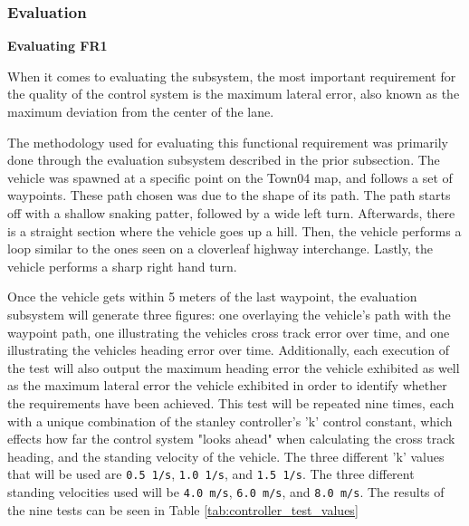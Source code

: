 \documentclass[titlepage,draft]{article}
\begin{document}
{\subsubsection{Evaluation}
\textbf{Evaluating FR1}

When it comes to evaluating the subsystem, the most important requirement for the quality of the control system is the maximum lateral error, also known as the maximum deviation from the center of the lane.

The methodology used for evaluating this functional requirement was primarily done through the evaluation subsystem described in the prior subsection. The vehicle was spawned at a specific point on the Town04 map, and follows a set of waypoints. These path chosen was due to the shape of its path. The path starts off with a shallow snaking patter, followed by a wide left turn. Afterwards, there is a straight section where the vehicle goes up a hill. Then, the vehicle performs a loop similar to the ones seen on a cloverleaf highway interchange. Lastly, the vehicle performs a sharp right hand turn.

Once the vehicle gets within 5 meters of the last waypoint, the evaluation subsystem will generate three figures: one overlaying the vehicle's path with the waypoint path, one illustrating the vehicles cross track error over time, and one illustrating the vehicles heading error over time. Additionally, each execution of the test will also output the maximum heading error the vehicle exhibited as well as the maximum lateral error the vehicle exhibited in order to identify whether the requirements have been achieved. This test will be repeated nine times, each with a unique combination of the stanley controller's 'k' control constant, which effects how far the control system "looks ahead" when calculating the cross track heading, and the standing velocity of the vehicle. The three different 'k' values that will be used are \texttt{0.5 1/s}, \texttt{1.0 1/s}, and \texttt{1.5 1/s}. The three different standing velocities used will be \texttt{4.0 m/s}, \texttt{6.0 m/s}, and \texttt{8.0 m/s}. The results of the nine tests can be seen in Table \ref{tab:controller_test_values}

}
\end{document}
